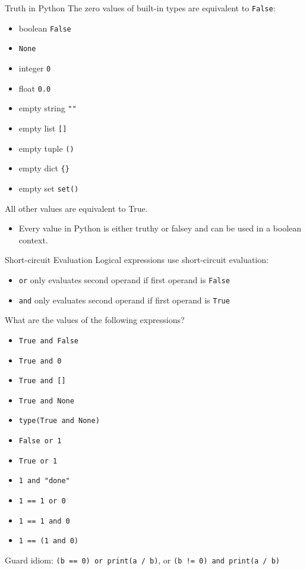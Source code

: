 \documentclass[smaller, aspectratio=1610]{beamer}
\begin{document}
\begin{frame}[label={sec:org6cf4460},fragile]{Truth in Python}
 The zero values of built-in types are equivalent to \texttt{False}:

\begin{itemize}
\item boolean \texttt{False}
\item \texttt{None}
\item integer \texttt{0}
\item float \texttt{0.0}
\item empty string \texttt{""}
\item empty list \texttt{[]}
\item empty tuple \texttt{()}
\item empty dict \texttt{\{\}}
\item empty set \texttt{set()}
\end{itemize}

All other values are equivalent to True.

\begin{itemize}
\item Every value in Python is either \alert{truthy} or \alert{falsey} and can be used in a boolean context.
\end{itemize}
\end{frame}

\begin{frame}[label={sec:orgc49aeed},fragile]{Short-circuit Evaluation}
 Logical expressions use short-circuit evaluation:

\begin{itemize}
\item \texttt{or} only evaluates second operand if first operand is \texttt{False}
\item \texttt{and} only evaluates second operand if first operand is \texttt{True}
\end{itemize}

What are the values of the following expressions?

\begin{itemize}
\item \texttt{True and False}
\item \texttt{True and 0}
\item \texttt{True and []}
\item \texttt{True and None}
\item \texttt{type(True and None)}
\item \texttt{False or 1}
\item \texttt{True or 1}
\item \texttt{1 and "done"}
\item \texttt{1 == 1 or 0}
\item \texttt{1 == 1 and 0}
\item \texttt{1 == (1 and 0)}
\end{itemize}


Guard idiom: \texttt{(b == 0) or print(a / b)}, or \texttt{(b != 0) and print(a / b)}
\end{frame}
\end{document}

